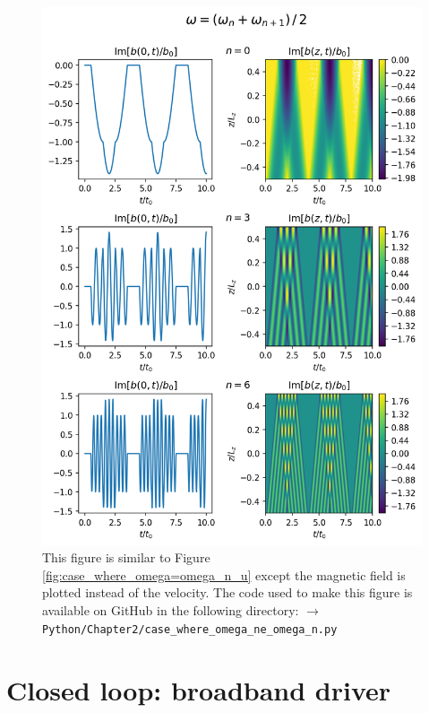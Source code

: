 \begin{figure}
    \centering
    \vspace{-20pt}
    \includegraphics[width=\textwidth,height=0.9\textheight,keepaspectratio]{figures/chapter02/case_where_omega_ne_omega_n_b.png}
    \vspace{-10pt}
    \caption{This figure is similar to Figure \ref{fig:case_where_omega=omega_n_u} except the magnetic field is plotted instead of the velocity. The code used to make this figure is available on GitHub in the following directory:\newline
    \texttt{$\rightarrow$ Python/Chapter2/case\_where\_omega\_ne\_omega\_n.py}}
    \vspace{-30pt}
    \label{fig:case_where_omega_ne_omega_n_b}
\end{figure}

\section{Closed loop: broadband driver}
\label{sec:closed_loop_random_driver}

